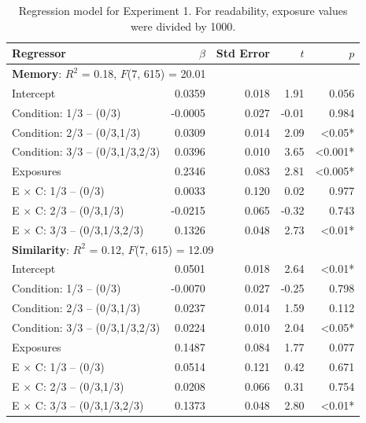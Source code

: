 \documentclass[man,floatsintext]{apa6}
\begin{document}
\newcommand{\ww}{\color{white}{*}} \newcommand\T{\rule{0pt}{2.1ex}}

\begin{table}[ht]
  \caption{Regression model for Experiment 1. For readability, exposure values were divided by 1000.}
  \label{expt1-regressions} 
  \begin{center}
  \footnotesize{
    \begin{tabular}{l r r r r}
      \hline
      Regressor & $\beta$ & Std Error & $t$ & $p$ \\ \hline
      \multicolumn{5}{l}{\T \textbf{Memory}: $R^2$ = 0.18, $F$(7, 615) = 20.01 \T}\\ 
      Intercept &  0.0359 &  0.018 &  1.91 & 0.056\ww\\
      Condition: 1/3 -- (0/3) & -0.0005 &  0.027 & -0.01 & 0.984\ww\\
      Condition: 2/3 -- (0/3,1/3) &  0.0309 &  0.014 &  2.09 & <0.05*\\
      Condition: 3/3 -- (0/3,1/3,2/3) &  0.0396 &  0.010 &  3.65 & <0.001*\\
      Exposures &  0.2346 &  0.083 &  2.81 & <0.005*\\
      E $\times$ C: 1/3 -- (0/3) &  0.0033 &  0.120 &  0.02 & 0.977\ww\\
      E $\times$ C: 2/3 -- (0/3,1/3) & -0.0215 &  0.065 & -0.32 & 0.743\ww\\
      E $\times$ C: 3/3 -- (0/3,1/3,2/3) &  0.1326 &  0.048 &  2.73 & <0.01* \\
      \hline

      \multicolumn{5}{l}{\T \textbf{Similarity}: $R^2$ = 0.12, $F$(7, 615) = 12.09 \T}\\
      Intercept &  0.0501 &  0.018 &  2.64 & <0.01*\\
      Condition: 1/3 -- (0/3) & -0.0070 &  0.027 & -0.25 & 0.798\ww\\
      Condition: 2/3 -- (0/3,1/3) &  0.0237 &  0.014 &  1.59 & 0.112\ww\\
      Condition: 3/3 -- (0/3,1/3,2/3) &  0.0224 &  0.010 &  2.04 & <0.05*\\
      Exposures &  0.1487 &  0.084 &  1.77 & 0.077\ww\\
      E $\times$ C: 1/3 -- (0/3) &  0.0514 &  0.121 &  0.42 & 0.671\ww\\
      E $\times$ C: 2/3 -- (0/3,1/3) &  0.0208 &  0.066 &  0.31 & 0.754\ww\\
      E $\times$ C: 3/3 -- (0/3,1/3,2/3) &  0.1373 &  0.048 &  2.80 & <0.01* \\
      \hline


\end{tabular}}
\end{center}
\end{table}
\end{document}
